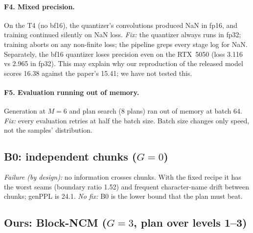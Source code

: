 \paragraph{F4. Mixed precision.}
On the T4 (no bf16), the quantizer's convolutions produced NaN in fp16, and training continued silently on NaN
loss. \emph{Fix:} the quantizer always runs in fp32; training aborts on any non-finite loss; the pipeline greps
every stage log for NaN. Separately, the bf16 quantizer loses precision even on the RTX~5050 (loss 3.116 vs
2.965 in fp32). This may explain why our reproduction of the released model scores 16.38 against the paper's
15.41; we have not tested this.

\paragraph{F5. Evaluation running out of memory.}
Generation at $M{=}6$ and plan search (8 plans) ran out of memory at batch 64. \emph{Fix:} every evaluation
retries at half the batch size. Batch size changes only speed, not the samples' distribution.

\subsection{B0: independent chunks ($G{=}0$)}
\emph{Failure (by design):} no information crosses chunks. With the fixed recipe it has the worst seams
(boundary ratio 1.52) and frequent character-name drift between chunks; genPPL is 24.1. \emph{No fix:} B0 is the
lower bound that the plan must beat.

\subsection{Ours: Block-NCM ($G{=}3$, plan over levels 1--3)}
